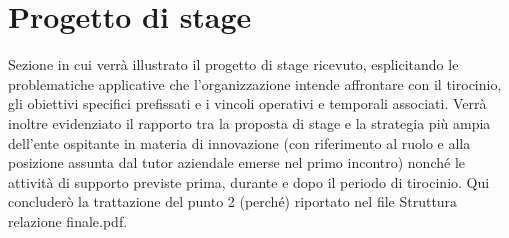 \section{Progetto di stage}

Sezione in cui verrà illustrato il progetto di stage ricevuto, esplicitando le problematiche applicative che l'organizzazione intende affrontare con il tirocinio, gli obiettivi specifici prefissati e i vincoli operativi e temporali associati. Verrà inoltre evidenziato il rapporto tra la proposta di stage e la strategia più ampia dell'ente ospitante in materia di innovazione (con riferimento al ruolo e alla posizione assunta dal tutor aziendale emerse nel primo incontro) nonché le attività di supporto previste prima, durante e dopo il periodo di tirocinio.
Qui concluderò la trattazione del punto 2 (perché) riportato nel file Struttura relazione finale.pdf.